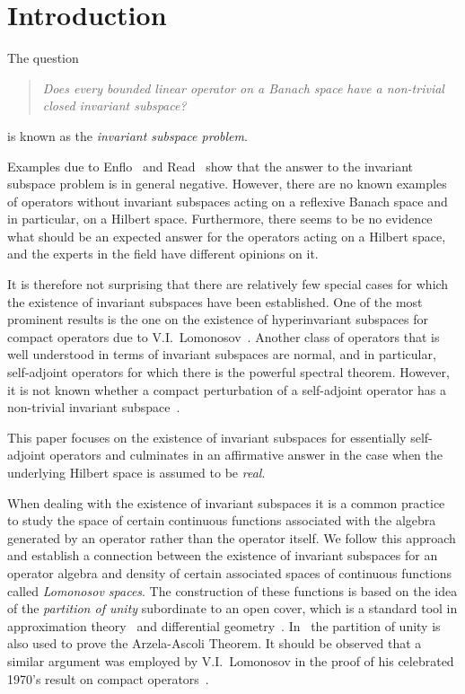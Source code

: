 \documentclass{tran-l}
\theoremstyle{definition}
\theoremstyle{remark}
\numberwithin{equation}{subsection}
\begin{document}
\section*{Introduction}

The question
\begin{quote}
\emph{Does every bounded linear operator on a Banach space have a non-trivial closed invariant subspace?}
\end{quote}
is known as the \emph{invariant subspace problem}.

\smallskip

Examples due to Enflo~\cite{Enf87} and Read~\cite{Rea85} show that the answer to the invariant subspace problem is in general negative. However, there are no known examples of operators without invariant subspaces acting on a reflexive Banach space and in particular, on a Hilbert space. Furthermore, there seems to be no evidence what should be an expected answer for the operators acting on a Hilbert space, and the experts in the field have different opinions on it.

It is therefore not surprising that there are relatively few special cases for which the existence of invariant subspaces have been established. One of the most prominent results is the one on the existence of hyperinvariant subspaces for compact operators due to V.I.~Lomonosov~\cite{Lom73,RR73}. Another class of operators that is well understood in terms of invariant subspaces are normal, and in particular, self-adjoint operators for which there is the powerful spectral theorem. However, it is not known whether a compact perturbation of a self-adjoint operator has a non-trivial invariant subspace~\cite{Lom92}.

This paper focuses on the existence of invariant subspaces for essentially self-adjoint operators and culminates in an affirmative answer in the case when the underlying Hilbert space is assumed to be \emph{real}.

When dealing with the existence of invariant subspaces it is a common practice~\cite{AAB95,dB93,Lom91,Sim96a} to study the space of certain continuous functions associated with the algebra generated by an operator rather than the operator itself. We follow this approach and establish a connection between the existence of invariant subspaces for an operator algebra and density of certain associated spaces of continuous functions called \emph{Lomonosov spaces}. The construction of these functions is based on the idea of the \emph{partition of unity} subordinate to an open cover, which is a standard tool in approximation theory~\cite{Gam90} and differential geometry~\cite{Dev68,Spi65}. In~\cite{Dev68} the partition of unity is also used to prove the Arzela-Ascoli Theorem. It should be observed that a similar argument was employed by V.I.~Lomonosov in the proof of his celebrated 1970's result on compact operators~\cite{Lom73}.
\end{document}
